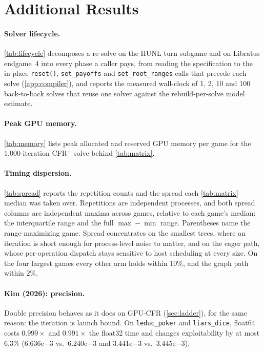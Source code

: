 \section{Additional Results}
\label{app:extra}




\paragraph{Solver lifecycle.}
\cref{tab:lifecycle} decomposes a re-solve on the HUNL turn subgame and on Libratus
endgame~4 into every phase a caller pays, from reading the specification to the
in-place \texttt{reset()}, \texttt{set\_payoffs} and \texttt{set\_root\_ranges}
calls that precede each solve (\cref{app:compiler}), and reports the measured
wall-clock of 1, 2, 10 and 100 back-to-back solves that reuse one solver against the
rebuild-per-solve model estimate.


\paragraph{Peak GPU memory.}
\cref{tab:memory} lists peak allocated and reserved GPU memory per game for the
1{,}000-iteration CFR$^{+}$ solve behind \cref{tab:matrix}.


\paragraph{Timing dispersion.}
\cref{tab:spread} reports the repetition counts and the spread each \cref{tab:matrix}
median was taken over. Repetitions are independent processes, and both spread columns
are independent maxima across games, relative to each game's median: the interquartile
range and the full $\max-\min$ range. Parentheses name the range-maximizing game.
Spread concentrates on the smallest trees, where an iteration is short enough for
process-level noise to matter, and on the eager path, whose per-operation dispatch stays
sensitive to host scheduling at every size. On the four largest games every other arm
holds within $10\%$, and the graph path within $2\%$.




\paragraph{Kim (2026): precision.}
Double precision behaves as it does on GPU-CFR (\cref{sec:ladder}), for the same reason: the
iteration is launch bound. On \texttt{leduc\_poker} and
\texttt{liars\_dice}, float64 costs $0.999\times$ and $0.991\times$ the float32 time
and changes exploitability by at most $6.3\%$
($6.636\mathrm{e}{-3}$ vs.\
$6.240\mathrm{e}{-3}$ and $3.441\mathrm{e}{-3}$ vs.\
$3.445\mathrm{e}{-3}$).


